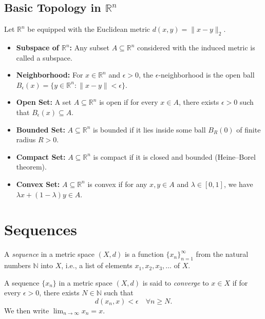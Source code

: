 \subsection{Basic Topology in $\mathbb{R}^n$}

Let $\mathbb{R}^n$ be equipped with the Euclidean metric $d(x,y) = \|x-y\|_2$.  

\begin{itemize}
    \item \textbf{Subspace of $\mathbb{R}^n$:} Any subset $A \subseteq \mathbb{R}^n$ considered with the induced metric is called a subspace.

    \item \textbf{Neighborhood:} For $x \in \mathbb{R}^n$ and $\epsilon > 0$, the $\epsilon$-neighborhood is the open ball $B_\epsilon(x) = \{y \in \mathbb{R}^n : \|x-y\| < \epsilon\}$.

    \item \textbf{Open Set:} A set $A \subseteq \mathbb{R}^n$ is open if for every $x \in A$, there exists $\epsilon > 0$ such that $B_\epsilon(x) \subseteq A$.

    \item \textbf{Bounded Set:} $A \subseteq \mathbb{R}^n$ is bounded if it lies inside some ball $B_R(0)$ of finite radius $R > 0$.

    \item \textbf{Compact Set:} $A \subseteq \mathbb{R}^n$ is compact if it is closed and bounded (Heine–Borel theorem).

    \item \textbf{Convex Set:} $A \subseteq \mathbb{R}^n$ is convex if for any $x,y \in A$ and $\lambda \in [0,1]$, we have $\lambda x + (1-\lambda)y \in A$.
\end{itemize}

\section{Sequences}

\begin{definition}
A \emph{sequence} in a metric space $(X,d)$ is a function $\{x_n\}_{n=1}^\infty$ from the natural numbers $\mathbb{N}$ into $X$, i.e., a list of elements $x_1, x_2, x_3, \dots$ of $X$.
\end{definition}

\begin{definition}
A sequence $\{x_n\}$ in a metric space $(X,d)$ is said to \emph{converge} to $x \in X$ if for every $\epsilon > 0$, there exists $N \in \mathbb{N}$ such that
\[
d(x_n, x) < \epsilon \quad \forall n \geq N.
\]
We then write $\lim_{n \to \infty} x_n = x$.
\end{definition}

